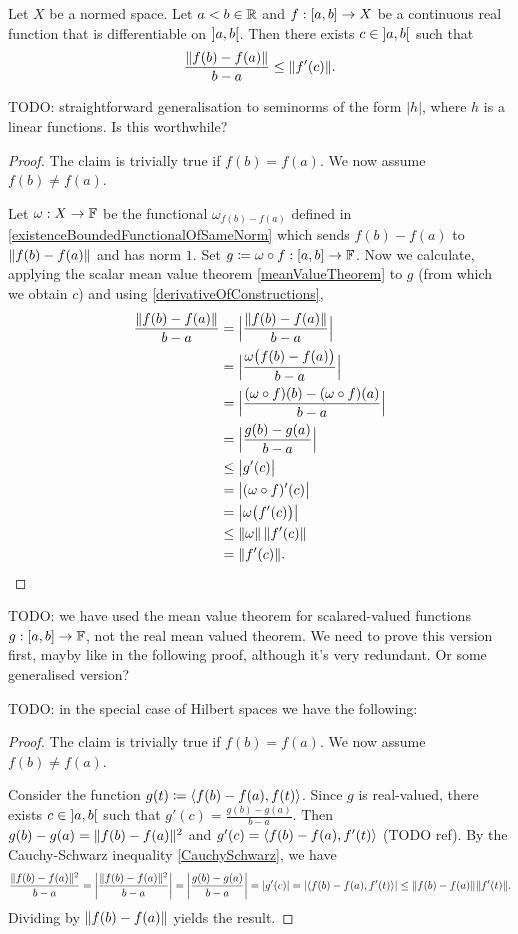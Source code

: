 \begin{proposition} \label{meanValueTheoremVectorFunctions}
Let $X$ be a normed space. Let $a<b\in \mathbb{R}$ and $f: \interval{a,b}\to X$ be a continuous real function that is differentiable on $\interval[o]{a,b}$. Then there exists $c\in \interval[o]{a,b}$ such that
\[ \frac{\lVert f(b)-f(a)\rVert}{b-a} \leq \lVert f'(c)\rVert. \]
\end{proposition}
TODO: straightforward generalisation to seminorms of the form $|h|$, where $h$ is a linear functions. Is this worthwhile?
\begin{proof}
The claim is trivially true if $f(b) = f(a)$. We now assume $f(b) \neq f(a)$.

Let $\omega: X\to \mathbb{F}$ be the functional $\omega_{f(b)-f(a)}$ defined in \ref{existenceBoundedFunctionalOfSameNorm} which sends $f(b)-f(a)$ to $\lVert f(b)-f(a)\rVert$ and has norm $1$. 
Set $g \defeq \omega \circ f: \interval{a,b}\to \F$.
Now we calculate, applying the scalar mean value theorem \ref{meanValueTheorem} to $g$ (from which we obtain $c$) and using \ref{derivativeOfConstructions},
\begin{align*}
\frac{\lVert f(b)-f(a)\rVert}{b-a} &= \Big|\frac{\lVert f(b)-f(a)\rVert}{b-a}\Big| \\
&= \Big|\frac{\omega\big(f(b)-f(a)\big)}{b-a}\Big| \\
&= \Big|\frac{(\omega\circ f)(b)-(\omega \circ f)(a)}{b-a}\Big| \\
&= \Big|\frac{g(b)- g(a)}{b-a}\Big| \\
&\leq \big|g'(c)\big| \\
&= \big|(\omega \circ f)'(c)\big| \\
&= \big|\omega\big(f'(c)\big)\big| \\
&\leq \lVert\omega\rVert\,\lVert f'(c)\rVert \\
&= \lVert f'(c)\rVert.
\end{align*}
\end{proof}
TODO: we have used the mean value theorem for scalared-valued functions $g: \interval{a,b}\to \F$, not the real mean valued theorem. We need to prove this version first, mayby like in the following proof, although it's very redundant. Or some generalised version?

TODO: in the special case of Hilbert spaces we have the following:
\begin{proof}
The claim is trivially true if $f(b) = f(a)$. We now assume $f(b) \neq f(a)$.

Consider the function $g(t) \defeq \inner{f(b)-f(a), f(t)}$. Since $g$ is real-valued, there exists $c\in \interval[o]{a,b}$ such that $g'(c) = \frac{g(b)-g(a)}{b-a}$. Then $g(b)-g(a) = \lVert f(b)-f(a)\rVert^2$ and $g'(c) = \inner{f(b)-f(a), f'(t)}$ (TODO ref). By the Cauchy-Schwarz inequality \ref{CauchySchwarz}, we have
\[ \frac{\norm{f(b)-f(a)}^2}{b-a} = \left|\frac{\norm{f(b)-f(a)}^2}{b-a}\right| = \left|\frac{g(b)-g(a)}{b-a}\right| = |g'(c)| = |\inner{f(b)-f(a), f'(t)}| \leq \norm{f(b)-f(a)} \norm{f'(t)}. \]
Dividing by $\lVert f(b)-f(a)\rVert$ yields the result.
\end{proof}

